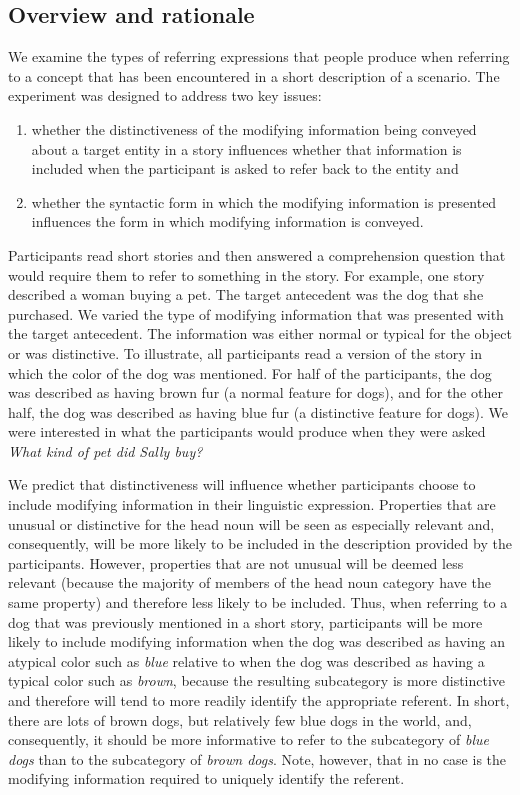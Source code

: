 \documentclass[output=paper]{langsci/langscibook}
\begin{document}
\subsection{Overview and rationale}

We examine the types of referring expressions that people produce when
referring to a concept that has been encountered in a short
description of a scenario. The experiment was designed to address two
key issues: 

\begin{enumerate}
	\item whether the distinctiveness of the modifying
information being conveyed about a target entity in a story influences
whether that information is included when the participant is asked to
refer back to the entity and 
	\item whether the syntactic form in which
the modifying information is presented influences the form in which
modifying information is conveyed.\end{enumerate}

\noindent Participants read short stories and
then answered a comprehension question that would require them to
refer to something in the story. For example, one story described a
woman buying a pet. The target antecedent was the dog that she
purchased. We varied the type of modifying information that was
presented with the target antecedent. The information was either
normal or typical for the object or was distinctive. To illustrate,
all participants read a version of the story in which the color of the
dog was mentioned. For half of the participants, the dog was described
as having brown fur (a normal feature for dogs), and for the other
half, the dog was described as having blue fur (a distinctive feature
for dogs). We were interested in what the participants would produce
when they were asked \textit{What kind of pet did Sally buy?}

We predict that distinctiveness will influence whether participants
choose to include modifying information in their linguistic
expression. Properties that are unusual or distinctive for the head
noun will be seen as especially relevant and, consequently, will be
more likely to be included in the description provided by the
participants. However, properties that are not unusual will be deemed
less relevant (because the majority of members of the head noun
category have the same property) and therefore less likely to be
included. Thus, when referring to a dog that was previously mentioned
in a short story, participants will be more likely to include
modifying information when the dog was described as having an atypical
color such as \textit{blue} relative to when the dog was described as
having a typical color such as \textit{brown}, because the resulting
subcategory is more distinctive and therefore will tend to more
readily identify the appropriate referent. In short, there are lots of
brown dogs, but relatively few blue dogs in the world, and,
consequently, it should be more informative to refer to the
subcategory of \textit{blue dogs} than to the subcategory of
\textit{brown dogs}. Note, however, that in no case is the modifying
information required to uniquely identify the referent.
\end{document}
